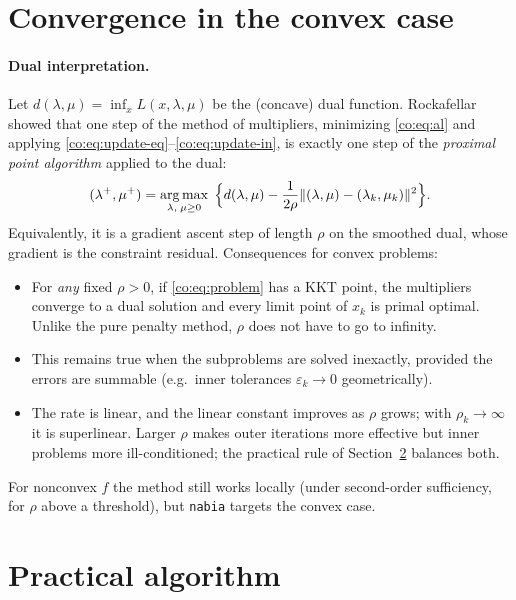 \section{Convergence in the convex case}

\paragraph{Dual interpretation.}
Let $d(\lambda,\mu)=\inf_x L(x,\lambda,\mu)$ be the (concave) dual function.
Rockafellar~\cite{rockafellar1976} showed that one step of the method of
multipliers, minimizing \eqref{co:eq:al} and applying
\eqref{co:eq:update-eq}--\eqref{co:eq:update-in}, is exactly one step of the
\emph{proximal point algorithm} applied to the dual:
\[
  (\lambda^+,\mu^+) = \operatorname*{arg\,max}_{\lambda,\;\mu\ge 0}\;
    \Big\{ d(\lambda,\mu) - \frac{1}{2\rho}\lVert (\lambda,\mu)-(\lambda_k,\mu_k)\rVert^2 \Big\}.
\]
Equivalently, it is a gradient ascent step of length $\rho$ on the smoothed dual,
whose gradient is the constraint residual. Consequences for convex problems:
\begin{itemize}
  \item For \emph{any} fixed $\rho>0$, if \eqref{co:eq:problem} has a KKT point, the
        multipliers converge to a dual solution and every limit point of
        $x_k$ is primal optimal. Unlike the pure penalty method, $\rho$ does not have to
        go to infinity.
  \item This remains true when the subproblems are solved inexactly, provided
        the errors are summable (e.g.\ inner tolerances $\varepsilon_k\to 0$
        geometrically).
  \item The rate is linear, and the linear constant improves as $\rho$ grows;
        with $\rho_k\to\infty$ it is superlinear. Larger $\rho$ makes outer
        iterations more effective but inner problems more ill-conditioned; the
        practical rule of Section~\ref{co:sec:practical} balances both.
\end{itemize}
For nonconvex $f$ the method still works locally (under second-order
sufficiency, for $\rho$ above a threshold), but \texttt{nabia} targets the
convex case.

\section{Practical algorithm}\label{co:sec:practical}

